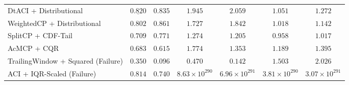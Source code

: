 \documentclass[12pt, a4paper]{article}
\begin{document}
\begin{table}[ht]
{\begin{tabular}{lcccccc}
			DtACI + Distributional             & \(\underline{0.820}\)                     & \(0.835\)                                       & \(1.945\)                                         & \(2.059\)                & \(1.051\)                & \(1.272\)                \\
			WeightedCP + Distributional        & \(\mathbf{0.802}\)                        & \(0.861\)                                       & \(1.727\)                                         & \(1.842\)                & \(1.018\)                & \(1.142\)                \\
			SplitCP + CDF-Tail                 & \(0.709\)                                 & \(0.771\)                                       & \(\mathbf{1.274}\)                                & \(\mathbf{1.205}\)       & \(0.958\)                & \(\mathbf{1.017}\)       \\
			AcMCP + CQR                        & \(0.683\)                                 & \(0.615\)                                       & \(1.774\)                                         & \(1.353\)                & \(1.189\)                & \(1.395\)                \\
			TrailingWindow + Squared (Failure) & \(0.350\)                                 & \(0.096\)                                       & \(0.470\)                                         & \(0.142\)                & \(1.503\)                & \(2.026\)                \\
			ACI + IQR-Scaled (Failure)         & \(0.814\)                                 & \(0.740\)                                       & \(8.63 \times 10^{290}\)                          & \(6.96 \times 10^{291}\) & \(3.81 \times 10^{290}\) & \(3.07 \times 10^{291}\) \\
			\hline
		\end{tabular}%
	}
\end{table}
\end{document}
